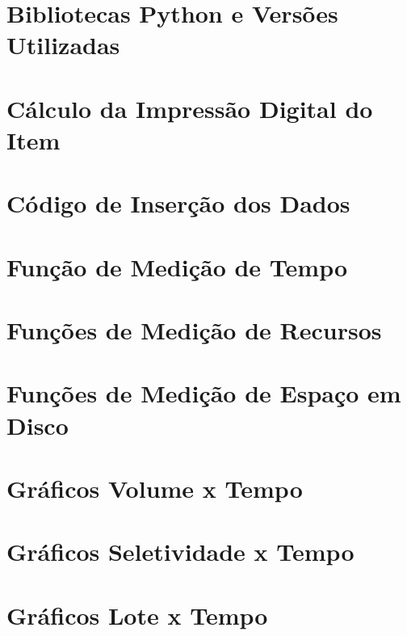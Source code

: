 \documentclass[english]{packages/icmc}
\begin{document}
\begin{apendicesenv}


	\chapter{Bibliotecas Python e Versões Utilizadas}
    \label{chapter:apendice-versoes}
    

	\chapter{Cálculo da Impressão Digital do Item}
    \label{chapter:apendice-hash}
    

	\chapter{Código de Inserção dos Dados}
    \label{chapter:apendice-codigos}
    

	\chapter{Função de Medição de Tempo}
    \label{chapter:apendice-medicao}
    

	\chapter{Funções de Medição de Recursos}
    \label{chapter:apendice-recursos}
    

	\chapter{Funções de Medição de Espaço em Disco}
    \label{chapter:apendice-espaco}
    

    \chapter{Gráficos Volume x Tempo}
    \label{chapter:apendice-volume}
    

	\chapter{Gráficos Seletividade x Tempo}
    \label{chapter:apendice-seletividade}
    

	\chapter{Gráficos Lote x Tempo}
    \label{chapter:apendice-lote}
    
\end{apendicesenv}
\end{document}
